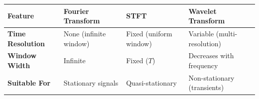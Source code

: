 \documentclass[12pt,a4paper]{article}
\renewcommand{\arraystretch}{1.45}
\begin{document}
\begin{tcolorbox}[tikzbox, title={Fourier vs. STFT vs. Wavelet Transform}]
\centering
{\renewcommand{\arraystretch}{1.55}%
\begin{tabularx}{\linewidth}{|>{\bfseries}B{3.2cm}|Y|Y|Y|}
\hline
Feature & Fourier Transform & STFT & Wavelet Transform \\
\hline
Time Resolution & None (infinite window) & Fixed (uniform window) & Variable (multi-resolution) \\
\hline
Window Width & Infinite & Fixed ($T$) & Decreases with frequency \\
\hline
Suitable For & Stationary signals & Quasi-stationary & Non-stationary (transients) \\
\hline
\end{tabularx}}
\end{tcolorbox}
\end{document}

